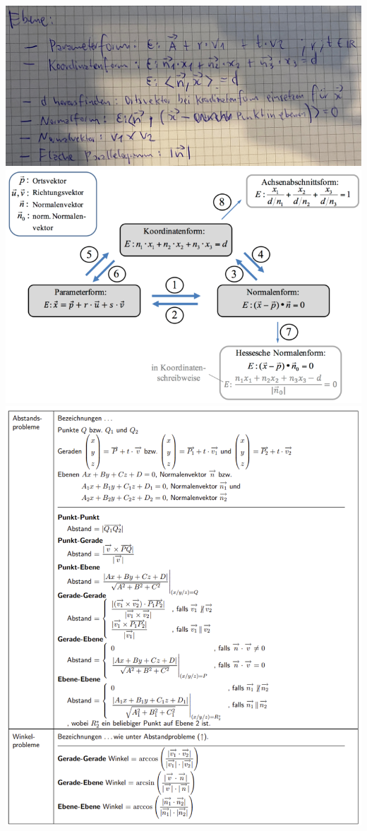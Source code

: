 \includegraphics[width=\columnwidth]{./images/vek36.jpg}
\includegraphics[width=\columnwidth]{./images/awesome.png}
\includegraphics[width=\columnwidth]{./images/Bild1.png}
\vspace{1mm}